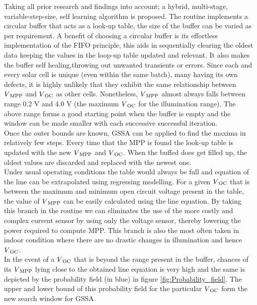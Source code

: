 Taking all prior research and findings into account; a hybrid, multi-stage, variable-step-size, self learning algorithm is proposed. The routine implements a circular buffer that acts as a look-up table, the size of the buffer can be varied as per requirement. A benefit of choosing a circular buffer is its effortless implementation of the \ac{FIFO} principle, this aids in sequentially clearing the oldest data keeping the values in the loop-up table updated and relevant. It also makes the buffer self healing,throwing out unwanted transients or errors. Since each and every solar cell is unique (even within the same batch), many having its own defects, it is highly unlikely that they exhibit the same relationship between $V\textsubscript{MPP}$ and $V\textsubscript{OC}$ as other cells. Nonetheless, $V\textsubscript{MPP}$ almost always falls between range 0.2 V and 4.0 V (the maximum $V\textsubscript{OC}$ for the illumination range). The above range forms a good starting point when the buffer is empty and the window can be made smaller with each successive successful iteration.\\

Once the outer bounds are known, \ac{GSSA} can be applied to find the maxima in relatively few steps. Every time that the \ac{MPP} is found the look-up table is updated with the new $V\textsubscript{MPP}$ and $V\textsubscript{OC}$. When the buffed does get filled up, the oldest values are discarded and replaced with the newest one.\\

 Under usual operating conditions the table would always be full and equation of the line can be extrapolated using regressing modelling. For a given $V\textsubscript{OC}$ that is between the maximum and minimum open circuit voltage present in the table, the value of $V\textsubscript{MPP}$ can be easily calculated using the line equation. By taking this branch in the routine we can eliminates the use of the more costly and complex current sensor \cite{urayai2011single} by using only the voltage sensor, thereby lowering the power required to compute \ac{MPP}. This branch is also the most often taken in indoor condition where there are no drastic changes in illumination and hence $V\textsubscript{OC}$.\\  
         
 In the event of a $V\textsubscript{OC}$ that is beyond the range present in the buffer, chances of its $V\textsubscript{MPP}$ lying close to the obtained line equation is very high and the same is depicted by the probability field (in blue) in figure \ref{fig:Probability_field}. The upper and lower bound of this probability field for the particular $V\textsubscript{OC}$ form the new search window for \ac{GSSA}.\\
 
